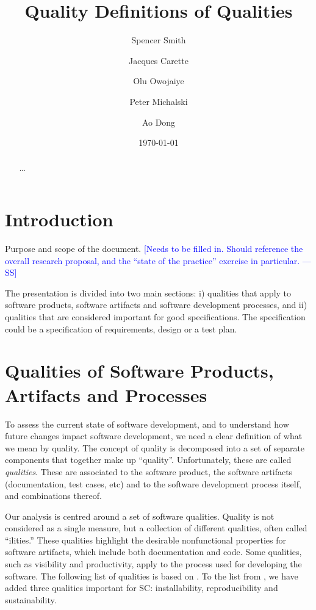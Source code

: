 \documentclass[letterpaper,cleveref]{lipics-v2019}
\title{Quality Definitions of Qualities}
\author{Spencer Smith}{McMaster University, Canada}{smiths@mcmaster.ca}{}{}
\author{Jacques Carette}{McMaster University, Canada}{carette@mcmaster.ca}{}{}
\author{Olu Owojaiye}{McMaster University, Canada}{owojaiyo@mcmaster.ca}{}{}
\author{Peter Michalski}{McMaster University, Canada}{michap@mcmaster.ca}{}{}
\author{Ao Dong}{McMaster University, Canada}{}{}{}
\date{\today}
\newcommand{\authornote}[3]{\textcolor{#1}{[#3 ---#2]}}
\newcommand{\authornote}[3]{}
\newcommand{\wss}[1]{\authornote{blue}{SS}{#1}} %
\theoremstyle{definition}
\begin{document}
\maketitle

\begin{abstract}
  ...
\end{abstract}

\tableofcontents

\section{Introduction} \label{SecIntroduction}

Purpose and scope of the document.  \wss{Needs to be filled in.  Should
  reference the overall research proposal, and the ``state of the practice''
  exercise in particular.}

The presentation is divided into two main sections: i) qualities that apply to
software products, software artifacts and software development processes, and
ii) qualities that are considered important for good specifications.  The
specification could be a specification of requirements, design or a test plan.

\section{Qualities of Software Products, Artifacts and
  Processes} \label{SecQualities}

To assess the current state of software development, and to understand how
future changes impact software development, we need a clear definition of what
we mean by quality.  The concept of quality is decomposed into a set of separate
components that together make up ``quality''. Unfortunately, these are
called \emph{qualities}. These are associated to the software product,
the software artifacts (documentation, test cases, etc) and to the software
development process itself, and combinations thereof.

Our analysis is centred around a set of software qualities.  Quality is not
considered as a single measure, but a collection of different qualities, often
called ``ilities.''  These qualities highlight the desirable nonfunctional
properties for software artifacts, which include both documentation and
code. Some qualities, such as visibility and productivity, apply to the process
used for developing the software. The following list of qualities is based on
\cite{GhezziEtAl2003}. To the list from \cite{GhezziEtAl2003}, we have added
three qualities important for SC: installability, reproducibility and
sustainability.
\end{document}
